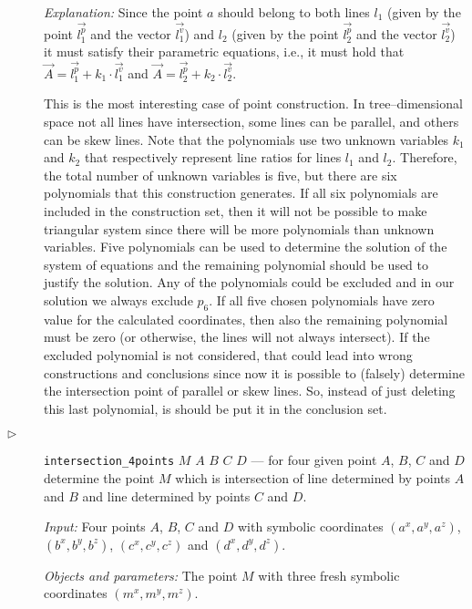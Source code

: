 \documentclass[final,1p,times,authoryear]{elsarticle}
\begin{document}
\begin{description}
{\em Explanation:} 
Since the point $a$ should belong to both lines $l_1$ (given by the
point $\overrightarrow{l_1^p}$ and the vector
$\overrightarrow{l_1^v}$) and $l_2$ (given by the point
$\overrightarrow{l_2^p}$ and the vector $\overrightarrow{l_2^v}$) it
must satisfy their parametric equations, i.e., it must hold that
$\overrightarrow{A} = \overrightarrow{l_1^p} + k_1 \cdot
\overrightarrow{l_1^v}$
and
$\overrightarrow{A} = \overrightarrow{l_2^p} + k_2 \cdot
\overrightarrow{l_2^v}$.

This is the most interesting case of point construction. In
tree--dimensional space not all lines have intersection, some lines
can be parallel, and others can be skew lines. Note that the
polynomials use two unknown variables $k_1$ and $k_2$ that
respectively represent line ratios for lines $l_1$ and
$l_2$. Therefore, the total number of unknown variables is five, but
there are six polynomials that this construction generates. If all six
polynomials are included in the construction set, then it will not be
possible to make triangular system since there will be more
polynomials than unknown variables. Five polynomials can be used to
determine the solution of the system of equations and the remaining
polynomial should be used to justify the solution. Any of the
polynomials could be excluded and in our solution we always exclude
$p_6$. If all five chosen polynomials have zero value for the
calculated coordinates, then also the remaining polynomial must be
zero (or otherwise, the lines will not always intersect). If the
excluded polynomial is not considered, that could lead into wrong
constructions and conclusions since now it is possible to (falsely)
determine the intersection point of parallel or skew lines. So,
instead of just deleting this last polynomial, is should be put it in
the conclusion set.

\item[$\triangleright$] {\tt intersection\_4points} $M$ $A$ $B$ $C$
  $D$ --- for four given point $A$, $B$, $C$ and $D$ determine the
  point $M$ which is intersection of line determined by points $A$ and
  $B$ and line determined by points $C$ and $D$.

  {\em Input:} Four points $A$, $B$, $C$ and $D$ with symbolic
  coordinates $(a^x, a^y, a^z)$, $(b^x, b^y, b^z)$, $(c^x, c^y, c^z)$
  and $(d^x, d^y, d^z)$.

  {\em Objects and parameters:} The point $M$ with three fresh
  symbolic coordinates $(m^x, m^y, m^z)$.


\end{description}
\end{document}
